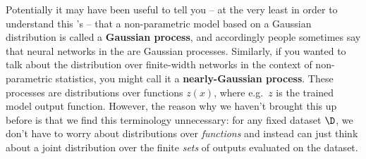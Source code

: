 {Potentially it may have been useful to tell you -- at the very least in order to understand this 's  --  that a non-parametric model based on a Gaussian distribution
 is called a \textbf{Gaussian process}, and accordingly people sometimes say that neural networks in the  are Gaussian processes. Similarly, if you wanted to talk about the distribution over finite-width networks in the context of non-parametric statistics, you might call it a \textbf{nearly-Gaussian process}. These processes are distributions over functions $z(x)$, where e.g.~$z$ is the trained model output function.
However, the reason why we haven't brought this up before is that we find this terminology
unnecessary: for any fixed dataset $\D$, we don't have to worry about distributions over \emph{functions} and instead can just think about a joint distribution over the finite \emph{sets} of outputs evaluated on the dataset.
}



